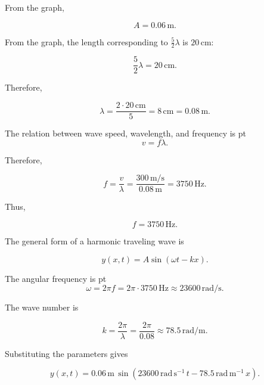 \documentclass[t,aspectratio=169]{beamer}
\begin{document}
\begin{frame}
\begin{enumerate}
\begin{center}
\end{center}
  
From the graph,

$$\boxed{A=0.06\,\mathrm{m}}.$$

From the graph, the length corresponding to $\frac{5}{2}\lambda$ is $20\,\mathrm{cm}$:

$$\frac{5}{2}\lambda=20\,\mathrm{cm}.$$

Therefore,

$$\lambda=\frac{2\cdot20\,\mathrm{cm}}{5}=8\,\mathrm{cm}=\boxed{0.08\,\mathrm{m}}.$$

The relation between wave speed, wavelength, and frequency is
 pt
$$v=f\lambda.$$

\pagebreak
Therefore,

$$f=\frac{v}{\lambda}=\frac{300\,\mathrm{m/s}}{0.08\,\mathrm{m}}=3750\,\mathrm{Hz}.$$

Thus,

$$\boxed{f=3750\,\mathrm{Hz}}.$$

The general form of a harmonic traveling wave is

$$y(x,t)=A\sin(\omega t-kx).$$

The angular frequency is
 pt
$$\omega=2\pi f=2\pi\cdot3750\,\mathrm{Hz}\approx23600\,\mathrm{rad/s}.$$

\pagebreak
The wave number is

$$k=\frac{2\pi}{\lambda}=\frac{2\pi}{0.08}\approx78.5\,\mathrm{rad/m}.$$

Substituting the parameters gives

$$\boxed{y(x,t)=0.06\,\mathrm{m}\,\sin(23600\,\mathrm{rad\,s^{-1}}\,t-78.5\,\mathrm{rad\,m^{-1}}\,x)}.$$



\end{enumerate}
\end{frame}
\end{document}
